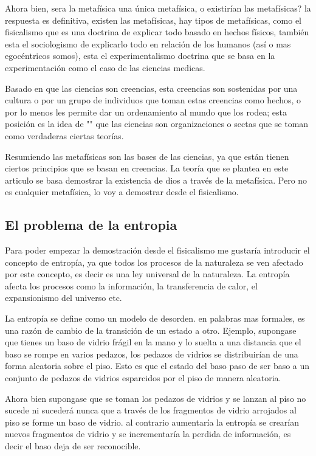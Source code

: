 \documentclass[12pt,letterpaper, a4paper ]{article}
\begin{document}
 Ahora bien, sera la metafísica una única metafísica, o existirían las metafísicas? la respuesta es definitiva, existen las metafísicas, hay tipos de metafísicas, como el fisicalismo que es una doctrina de explicar todo
 basado en hechos físicos, también esta el sociologismo de explicarlo todo en relación de los humanos (así o mas egocéntricos somos), esta el experimentalismo doctrina que se basa en la experimentación como el caso de las ciencias medicas.
 
 Basado en que las ciencias son creencias, esta creencias son sostenidas por una cultura o por un grupo de individuos que toman estas creencias como hechos, o por lo menos les permite dar un ordenamiento al mundo que los rodea; esta posición es la idea de "" que las ciencias son organizaciones o sectas que se toman como verdaderas ciertas teorías.
 
 Resumiendo las metafísicas son las bases de las ciencias, ya que están tienen ciertos principios que se basan en creencias. La teoría que se plantea en este articulo se basa demostrar la existencia de dios a través de la metafísica. Pero no es cualquier metafísica, lo voy a demostrar desde el fisicalismo.
 

\subsection{El problema de la entropia}

Para poder empezar la demostración desde el fisicalismo me gustaría introducir el concepto de entropía, ya que todos los procesos de la naturaleza se ven afectado por este concepto, es decir es una ley universal de la naturaleza.
La entropía afecta los procesos como la información, la transferencia de calor, el expansionismo del universo etc.

La entropía se define como un modelo de desorden. en palabras mas formales, es una razón de cambio de la transición de un estado a otro. Ejemplo, supongase que tienes un baso de vidrio frágil en la mano y lo suelta a una distancia que el baso se rompe en varios pedazos,
los pedazos de vidrios se distribuirían de una forma aleatoria sobre el piso. Esto es que el estado del baso paso de ser baso a un conjunto de pedazos de vidrios esparcidos por el piso de manera aleatoria.

Ahora bien supongase que se toman los pedazos de vidrios y se lanzan al piso
no sucede ni sucederá nunca que a través de los fragmentos de vidrio arrojados al piso se forme un baso de vidrio. al contrario aumentaría la entropía se crearían nuevos fragmentos de vidrio y se incrementaría la perdida de información, es decir el baso deja de ser reconocible.
\end{document}
